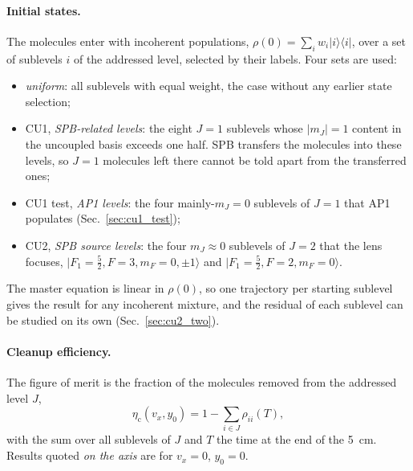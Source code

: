 \documentclass[11pt,a4paper,oneside]{report}
\newcommand{\etac}{\eta_{\mathrm{c}}}
\begin{document}
\paragraph{Initial states.} The molecules enter with incoherent populations,
$\rho(0)=\sum_i w_i|i\rangle\langle i|$, over a set of sublevels $i$ of the addressed level, selected
by their labels. Four sets are used:
\begin{itemize}[itemsep=1pt]
  \item \emph{uniform}: all sublevels with equal weight, the case without any earlier state selection;
  \item CU1, \emph{SPB-related levels}: the eight $J=1$ sublevels whose $|m_J|=1$ content in the
        uncoupled basis exceeds one half. SPB transfers the molecules into these levels, so $J=1$
        molecules left there cannot be told apart from the transferred ones;
  \item CU1 test, \emph{AP1 levels}: the four mainly-$m_J=0$ sublevels of $J=1$ that AP1 populates
        (Sec.~\ref{sec:cu1_test});
  \item CU2, \emph{SPB source levels}: the four $m_J\approx0$ sublevels of $J=2$ that the lens focuses,
        $|F_1=\tfrac52,F=3,m_F=0,\pm1\rangle$ and $|F_1=\tfrac52,F=2,m_F=0\rangle$.
\end{itemize}
The master equation is linear in $\rho(0)$, so one trajectory per starting sublevel gives the result
for any incoherent mixture, and the residual of each sublevel can be studied on its own
(Sec.~\ref{sec:cu2_two}).

\paragraph{Cleanup efficiency.} The figure of merit is the fraction of the molecules removed from the
addressed level $J$,
\begin{equation}
  \etac(v_x,y_0)=1-\sum_{i\in J}\rho_{ii}(T),
\end{equation}
with the sum over all sublevels of $J$ and $T$ the time at the end of the \SI{5}{cm}. Results quoted
\emph{on the axis} are for $v_x=0$, $y_0=0$.
\end{document}
